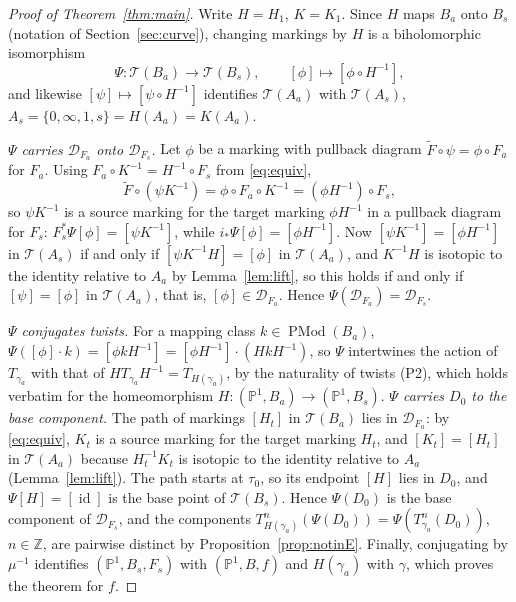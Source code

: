 \documentclass[11pt]{article}
\newcommand{\Pone}{\mathbb P^1}
\newcommand{\Z}{\mathbb Z}
\newcommand{\Teich}{\mathcal T}
\newcommand{\D}{\mathcal D}
\newcommand{\id}{\operatorname{id}}
\newcommand{\PMod}{\operatorname{PMod}}
\theoremstyle{remark}
\numberwithin{equation}{section}
\begin{document}
\begin{proof}[Proof of Theorem~\ref{thm:main}]
Write $H=H_1$, $K=K_1$. Since $H$ maps $B_a$ onto $B_s$ (notation of
Section~\ref{sec:curve}), changing markings by $H$ is a biholomorphic
isomorphism
\[
 \Psi\colon\Teich(B_a)\longrightarrow\Teich(B_s),\qquad
 [\phi]\longmapsto[\phi\circ H^{-1}],
\]
and likewise $[\psi]\mapsto[\psi\circ H^{-1}]$ identifies $\Teich(A_a)$
with $\Teich(A_s)$, $A_s=\{0,\infty,1,s\}=H(A_a)=K(A_a)$.

\emph{$\Psi$ carries $\D_{F_a}$ onto $\D_{F_s}$.} Let $\phi$ be a marking
with pullback diagram $\widetilde F\circ\psi=\phi\circ F_a$ for $F_a$.
Using $F_a\circ K^{-1}=H^{-1}\circ F_s$ from \eqref{eq:equiv},
\[
 \widetilde F\circ(\psi K^{-1})=\phi\circ F_a\circ K^{-1}
 =(\phi H^{-1})\circ F_s ,
\]
so $\psi K^{-1}$ is a source marking for the target marking $\phi H^{-1}$
in a pullback diagram for $F_s$: $F_s^*\Psi[\phi]=[\psi K^{-1}]$, while
$i_*\Psi[\phi]=[\phi H^{-1}]$. Now $[\psi K^{-1}]=[\phi H^{-1}]$ in
$\Teich(A_s)$ if and only if $[\psi K^{-1}H]=[\phi]$ in $\Teich(A_a)$, and
$K^{-1}H$ is isotopic to the identity relative to $A_a$ by
Lemma~\ref{lem:lift}, so this holds if and only if $[\psi]=[\phi]$ in
$\Teich(A_a)$, that is, $[\phi]\in\D_{F_a}$. Hence
$\Psi(\D_{F_a})=\D_{F_s}$.

\emph{$\Psi$ conjugates twists.} For a mapping class $k\in\PMod(B_a)$,
$\Psi([\phi]\cdot k)=[\phi kH^{-1}]=[\phi H^{-1}]\cdot(HkH^{-1})$, so $\Psi$
intertwines the action of $T_{\gamma_a}$ with that of
$HT_{\gamma_a}H^{-1}=T_{H(\gamma_a)}$, by the naturality of twists (P2),
which holds verbatim for the homeomorphism $H\colon(\Pone,B_a)\to(\Pone,B_s)$.
\emph{$\Psi$ carries $D_0$ to the base component.} The path of markings
$[H_t]$ in $\Teich(B_a)$ lies in $\D_{F_a}$: by \eqref{eq:equiv}, $K_t$ is
a source marking for the target marking $H_t$, and $[K_t]=[H_t]$ in
$\Teich(A_a)$ because $H_t^{-1}K_t$ is isotopic to the identity relative to
$A_a$ (Lemma~\ref{lem:lift}). The path starts at $\tau_0$, so its endpoint
$[H]$ lies in $D_0$, and $\Psi[H]=[\id]$ is the base point of
$\Teich(B_s)$. Hence $\Psi(D_0)$ is the base component of $\D_{F_s}$, and
the components $T_{H(\gamma_a)}^n(\Psi(D_0))=\Psi(T_{\gamma_a}^n(D_0))$,
$n\in\Z$, are pairwise distinct by Proposition~\ref{prop:notinE}. Finally,
conjugating by $\mu^{-1}$ identifies $(\Pone,B_s,F_s)$ with $(\Pone,B,f)$
and $H(\gamma_a)$ with $\gamma$, which proves the theorem for $f$.
\end{proof}
\end{document}
